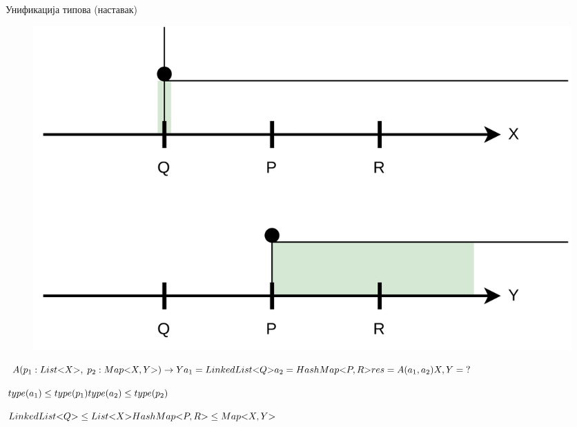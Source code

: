 \documentclass[xcolor=table]{beamer}
\begin{document}
\begin{frame}[allowframebreaks]{Унификација типова (наставак)}
        \begin{figure}
            \centering
            \includegraphics[width=\textwidth,height=0.8\textheight,keepaspectratio]{images/unip1.png}
        \end{figure}
        
        \framebreak
        
        \begin{math}
A(p_1: List\mathord{<}X\mathord{>},\;p_2: Map\mathord{<}X, Y\mathord{>})\to Y
\newline
a_1 = LinkedList\mathord{<}Q\mathord{>}
\newline
a_2 = HashMap\mathord{<}P, R\mathord{>}
\newline
\newline
res = A(a_1, a_2)
\newline
X, Y = \;?
        \end{math}
        
        \framebreak
        
        \begin{math}
type(a_1) \leq type(p_1)
\newline
type(a_2) \leq type(p_2)
\newline
        \end{math}
        
        \framebreak
        
        \begin{math}
LinkedList\mathord{<}Q\mathord{>} \leq List\mathord{<}X\mathord{>}
\newline
HashMap\mathord{<}P, R\mathord{>} \leq Map\mathord{<}X, Y\mathord{>}
        \end{math}
        
        \framebreak
        

\end{frame}
\end{document}
